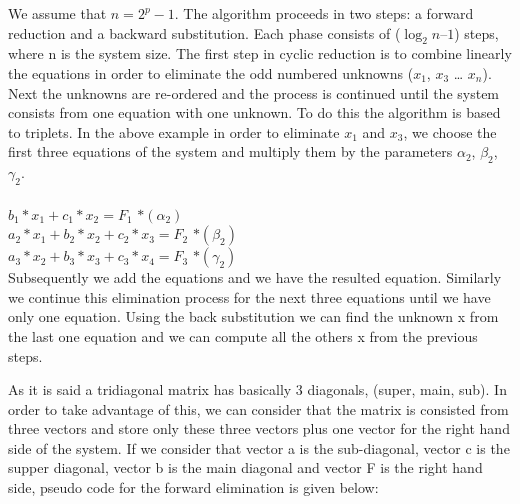We assume that $n= 2^p - 1$. 
The algorithm proceeds in two steps: a forward reduction and a backward substitution. Each phase consists of ($\log_2n – 1$) steps, where n is the system size. The first step in cyclic reduction is to combine linearly the equations in order to eliminate the odd numbered unknowns ($x_1$, $x_3$ … $x_n$). Next the unknowns are re-ordered and the process is continued until the system consists from one equation with one unknown. To do this the algorithm is based to triplets. In the above example in order to eliminate $x_1$ and $x_3$, we choose the first three equations of the system and multiply them by the parameters $\alpha_2$, $\beta_2$, $\gamma_2$. \\
\\
$b_1*x_1+c_1*x_2= F_1$                        \hspace*{5cm} $*(\alpha_2)$	\\
$a_2*x_1+ b_2*x_2+c_2*x_3= F_2$               \hspace*{3,3cm} $* (\beta_2)$  \\
\hspace*{2cm}$a_3*x_2+ b_3*x_3+c_3*x_4= F_3$  \hspace*{1,3cm} $*(\gamma_2)$     \\

Subsequently we add the equations and we have the resulted equation. Similarly we continue this elimination process for the next three equations until we have only one equation.
Using the back substitution we can find the unknown x from the last one equation and we can compute all the others x from the previous steps.

As it is said a tridiagonal matrix has basically 3 diagonals, (super, main, sub). In order to take advantage of this, we can consider that the matrix is consisted from three vectors and store only these three vectors plus one vector for the right hand side of the system.
If we consider that vector a is the sub-diagonal, vector c is the supper diagonal, vector b is the main diagonal and vector F is the right hand side, pseudo code for the forward elimination is given below: \\


